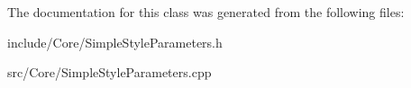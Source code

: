 The documentation for this class was generated from the following files:\begin{DoxyCompactItemize}
\item 
include/Core/SimpleStyleParameters.h\item 
src/Core/SimpleStyleParameters.cpp\end{DoxyCompactItemize}
